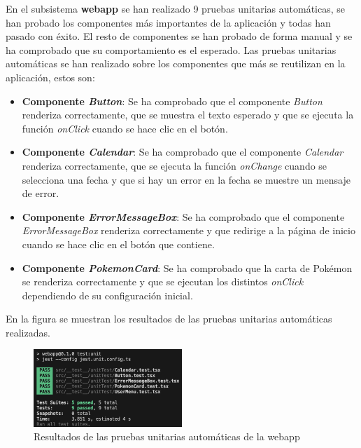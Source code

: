 En el subsistema \textbf{webapp} se han realizado 9 pruebas unitarias automáticas, se han probado los componentes más importantes de la aplicación y todas han pasado con éxito.
El resto de componentes se han probado de forma manual y se ha comprobado que su comportamiento es el esperado.
Las pruebas unitarias automáticas se han realizado sobre los componentes que más se reutilizan en la aplicación, estos son:
\begin{itemize}
    \item \textbf{Componente \textit{Button}}: Se ha comprobado que el componente \textit{Button} renderiza correctamente, que se muestra el texto esperado y que se ejecuta la función \textit{onClick} cuando se hace clic en el botón.
    \item \textbf{Componente \textit{Calendar}}: Se ha comprobado que el componente \textit{Calendar} renderiza correctamente, que se ejecuta la función \textit{onChange} cuando se selecciona una fecha y que si hay un error en la fecha se muestre un mensaje de error.
    \item \textbf{Componente \textit{ErrorMessageBox}}: Se ha comprobado que el componente \textit{ErrorMessageBox} renderiza correctamente y que redirige a la página de inicio cuando se hace clic en el botón que contiene.
    \item \textbf{Componente \textit{PokemonCard}}: Se ha comprobado que la carta de Pokémon se renderiza correctamente y que se ejecutan los distintos \textit{onClick} dependiendo de su configuración inicial.
\end{itemize}
En la figura  se muestran los resultados de las pruebas unitarias automáticas realizadas.
\begin{figure}[H]
    \centering
    \includegraphics[width=0.5\textwidth]{figures/6-Analisis/6-Pruebas/6_8_webapp-unit.png}
    \caption{Resultados de las pruebas unitarias automáticas de la webapp}
    \hypertarget{fig:coverage_webapp}{}
    \label{fig:coverage_webapp}
\end{figure}

